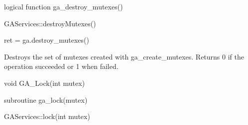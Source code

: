 \documentclass[10pt]{article}
\begin{document}
\begin{fapi}
\begin{fcode}
logical function ga_destroy_mutexes()
\end{fcode}
\end{fapi}

\begin{cxxapi}
\begin{cxxcode}
GAServices::destroyMutexes()
\end{cxxcode}
\end{cxxapi}

\begin{pyapi}
\begin{pycode}
ret = ga.destroy_mutexes()
\end{pycode}
\begin{funcargs}
\end{funcargs}
\end{pyapi}

\wcoll

\begin{desc}

Destroys the set of mutexes created with ga_create_mutexes. Returns 0 if the
operation succeeded or 1 when failed.

\end{desc}



\begin{capi}
\begin{ccode}
void GA_Lock(int mutex)
\end{ccode}
\begin{funcargs}
\end{funcargs}
\end{capi}

\begin{fapi}
\begin{fcode}
subroutine ga_lock(mutex)
\end{fcode}
\begin{funcargs}
\end{funcargs}
\end{fapi}

\begin{cxxapi}
\begin{cxxcode}
GAServices::lock(int mutex)
\end{cxxcode}
\begin{funcargs}
\end{funcargs}
\end{cxxapi}
\end{document}
